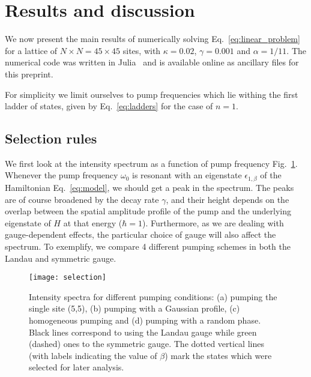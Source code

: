\documentclass[twocolumn, 10pt, aps, superscriptaddress, floatfix, showpacs, pra, citeautoscript]{revtex4-1}
\newcommand{\co}[2]{#2}
\renewcommand{\paragraph}{\co}
\begin{document}
\section{Results and discussion}
\label{sec:results}

We now present the main results of numerically solving
Eq.~\eqref{eq:linear_problem} for a lattice of
$N \times N = 45 \times 45$ sites, with $\kappa = 0.02$,
$\gamma = 0.001$ and $\alpha = 1/11$.  The numerical code was written
in Julia~\cite{bezanson2014julia} and is available online as ancillary
files for this preprint.

For simplicity we limit ourselves to pump frequencies which lie
withing the first ladder of states, given by Eq.~\eqref{eq:ladders}
for the case of $n = 1$.


\subsection{Selection rules}
\label{sec:selection}

\paragraph{The overlap between the pump state and the eigenstate determines the intensity.}
We first look at the intensity spectrum as a function of pump
frequency Fig.~\ref{fig:pumping_schemes}.  Whenever the pump frequency
$\omega_0$ is resonant with an eigenstate $\epsilon_{1,\beta}$ of the
Hamiltonian Eq.~\eqref{eq:model}, we should get a peak in the
spectrum. The peaks are of course broadened by the decay rate
$\gamma$, and their height depends on the overlap between the spatial
amplitude profile of the pump and the underlying eigenstate of $H$ at
that energy ($\hbar = 1$). Furthermore, as we are dealing with
gauge-dependent effects, the particular choice of gauge will also
affect the spectrum. To exemplify, we compare 4 different pumping
schemes in both the Landau and symmetric gauge.
%
\begin{figure}[htb]\centering
  \texttt{[image: selection]}
  \caption{Intensity spectra for different pumping conditions: (a)
    pumping the single site (5,5), (b) pumping with a Gaussian
    profile, (c) homogeneous pumping and (d) pumping with a random
    phase. Black lines correspond to using the Landau gauge while
    green (dashed) ones to the symmetric gauge. The dotted vertical
    lines (with labels indicating the value of $\beta$)
    mark the states which were selected for later analysis.}
  \label{fig:pumping_schemes}
\end{figure}
\end{document}
